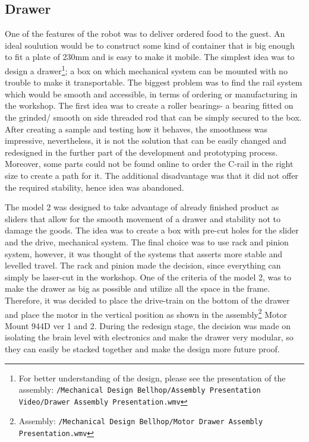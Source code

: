 \documentclass[11pt]{article}
\begin{document}
\subsection*{Drawer}
One of the features of the robot was to deliver ordered food to the guest. An ideal soulution would be to construct some kind of container that is big enough to fit a plate of 230mm and is easy to make it mobile. The simplest idea was to design a drawer\footnote{For better understanding of the design, please see the presentation of the assembly: \texttt{/Mechanical Design Bellhop/Assembly Presentation Video/Drawer Assembly Presentation.wmv}}; a box on which mechanical system can be mounted with no trouble to make it transportable. The biggest problem was to find the rail system which would be smooth and accessible, in terms of ordering or manufacturing in the workshop. The first idea was to create a roller bearings- a bearing fitted on the grinded/ smooth on side threaded rod that can be simply secured to the box. After creating a sample and testing how it behaves, the smoothness was impressive, nevertheless, it is not the solution that can be easily changed and redesigned in the further part of the development and prototyping process. Moreover, some parts could not be found online to order the C-rail in the right size to create a path for it. The additional disadvantage was that it did not offer the required stability, hence idea was abandoned. 


The model 2 was designed to take advantage of already finished product as sliders that allow for the smooth movement of a drawer and stability not to damage the goods. The idea was to create a box with pre-cut holes for the slider and the drive, mechanical system. The final choice was to use rack and pinion system, however, it was thought of the systems that asserts more stable and levelled travel. The rack and pinion made the decision, since everything can simply be laser-cut in the workshop. One of the criteria of the model 2, was to make the drawer as big as possible and utilize all the space in the frame. Therefore, it was decided to place the drive-train on the bottom of the drawer and place the motor in the vertical position as shown in the assembly\footnote{Assembly: \texttt{/Mechanical Design Bellhop/Motor Drawer Assembly Presentation.wmv}} Motor Mount 944D ver 1 and 2. During the redesign stage, the decision was made on isolating the brain level with electronics and make the drawer very modular, so they can easily be stacked together and make the design more future proof.
\end{document}
